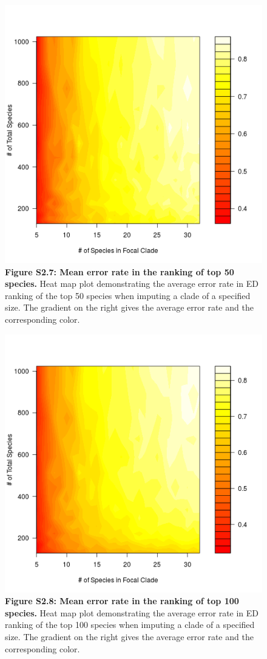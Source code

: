 \documentclass[10pt,english]{article}
\begin{document}
\begin{figure}[!ht]
  \center
  \includegraphics[width=.5\textwidth]{../figures/errorRate50.png}
  \caption*{\textbf{Figure S2.7: Mean error rate in the ranking of top 50
  species.} Heat map plot demonstrating the average error rate in ED ranking of
  the top 50 species when imputing a clade of a specified size. The gradient on
  the right gives the average error rate and the corresponding color.}
\end{figure}

\begin{figure}[!ht]
  \center
  \includegraphics[width=.5\textwidth]{../figures/errorRate100.png}
  \caption*{\textbf{Figure S2.8: Mean error rate in the ranking of top 100
  species.} Heat map plot demonstrating the average error rate in ED ranking of
  the top 100 species when imputing a clade of a specified size. The gradient on
  the right gives the average error rate and the corresponding color.}
\end{figure}
\end{document}
